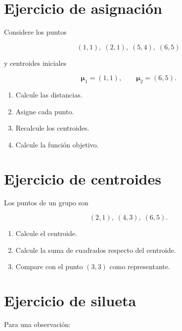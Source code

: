 \documentclass[
  spanish,
  10.5pt,
  letterpaper,
  DIV=11,
  numbers=noendperiod,
  oneside,
  open=any]{scrreprt}
\providecommand{\tightlist}{%
  \setlength{\itemsep}{0pt}\setlength{\parskip}{0pt}}
\theoremstyle{definition}
\theoremstyle{definition}
\theoremstyle{plain}
\theoremstyle{remark}
\begin{document}
\section*{Ejercicio de asignación}\label{ejercicio-de-asignaciuxf3n}


Considere los puntos

\[
(1,1),\;(2,1),\;(5,4),\;(6,5)
\]

y centroides iniciales

\[
\boldsymbol{\mu}_1=(1,1),
\qquad
\boldsymbol{\mu}_2=(6,5).
\]

\begin{enumerate}
\def\labelenumi{\arabic{enumi}.}
\tightlist
\item
  Calcule las distancias.
\item
  Asigne cada punto.
\item
  Recalcule los centroides.
\item
  Calcule la función objetivo.
\end{enumerate}

\section*{Ejercicio de centroides}\label{ejercicio-de-centroides}


Los puntos de un grupo son

\[
(2,1),\;(4,3),\;(6,5).
\]

\begin{enumerate}
\def\labelenumi{\arabic{enumi}.}
\tightlist
\item
  Calcule el centroide.
\item
  Calcule la suma de cuadrados respecto del centroide.
\item
  Compare con el punto \((3,3)\) como representante.
\end{enumerate}

\section*{Ejercicio de silueta}\label{ejercicio-de-silueta}


Para una observación:
\end{document}
